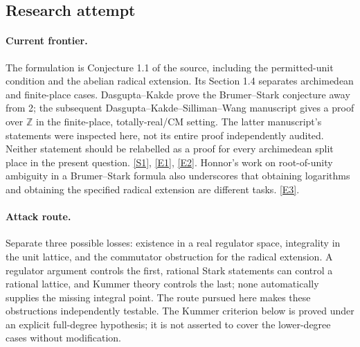 \documentclass[11pt,a4paper]{article}
\newcommand{\Z}{\mathbb{Z}}
\newcommand{\sref}[2]{\hyperlink{source:#1:#2}{[S#2]}}
\newcommand{\eref}[2]{\hyperlink{extra:#1:#2}{[E#2]}}
\numberwithin{equation}{section}
\begin{document}
\subsection{Research attempt}

\paragraph{Current frontier.}
The formulation is Conjecture 1.1 of the source, including the permitted-unit
condition and the abelian radical extension. Its Section 1.4 separates
archimedean and finite-place cases. Dasgupta--Kakde prove the Brumer--Stark
conjecture away from 2; the subsequent Dasgupta--Kakde--Silliman--Wang
manuscript gives a proof over $\Z$ in the finite-place, totally-real/CM
setting. The latter manuscript's statements were inspected here, not its
entire proof independently audited. Neither statement should be relabelled
as a proof for every archimedean split place in the present question.
\sref{198}{1}, \eref{198}{1}, \eref{198}{2}.
Honnor's work on root-of-unity ambiguity in a Brumer--Stark formula also
underscores that obtaining logarithms and obtaining the specified radical
extension are different tasks. \eref{198}{3}.

\paragraph{Attack route.}
Separate three possible losses: existence in a real regulator space,
integrality in the unit lattice, and the commutator obstruction for the
radical extension. A regulator argument controls the first, rational Stark
statements can control a rational lattice, and Kummer theory controls the
last; none automatically supplies the missing integral point. The route
pursued here makes these obstructions independently testable. The Kummer
criterion below is proved under an explicit full-degree hypothesis; it is
not asserted to cover the lower-degree cases without modification.
\end{document}
